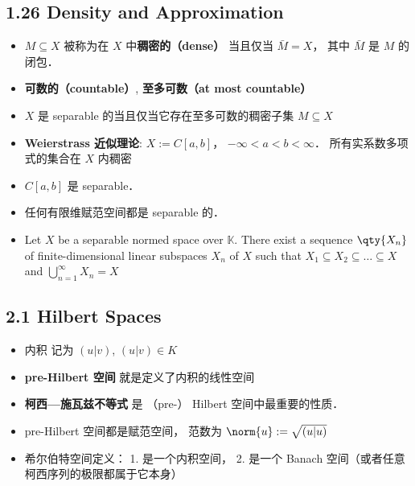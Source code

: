 \subsection{1.26 Density and Approximation}
\begin{itemize}
\item $M \subseteq X$ 被称为在 $X$ 中\textbf{稠密的（dense）} 当且仅当 $\bar M = X$， 其中 $\bar M$ 是 $M$ 的闭包．

\item \textbf{可数的（countable）}, \textbf{至多可数（at most countable）}

\item $X$ 是 separable 的当且仅当它存在至多可数的稠密子集 $M \subseteq X$

\item \textbf{Weierstrass 近似理论}: $X := C[a, b]$， $-\infty < a < b < \infty$． 所有实系数多项式的集合在 $X$ 内稠密

\item $C[a, b]$ 是 separable．

\item 任何有限维赋范空间都是 separable 的．

\item Let $X$ be a separable normed space over $\mathbb K$. There exist a sequence $\qty{X_n}$ of finite-dimensional linear subspaces $X_n$ of $X$ such that $X_1 \subseteq X_2 \subseteq \dots \subseteq X$ and $\bigcup_{n=1}^\infty X_n = X$

\end{itemize}

\subsection{2.1 Hilbert Spaces}
\begin{itemize}
\item 内积 记为 $(u|v)$, $(u|v) \in K$

\item \textbf{pre-Hilbert 空间}  就是定义了内积的线性空间

\item \textbf{柯西—施瓦兹不等式} 是 （pre-） Hilbert 空间中最重要的性质．

\item pre-Hilbert 空间都是赋范空间， 范数为 $\norm{u} := \sqrt{(u|u)}$

\item 希尔伯特空间定义： 1. 是一个内积空间， 2. 是一个 Banach 空间（或者任意柯西序列的极限都属于它本身）

\end{itemize}
